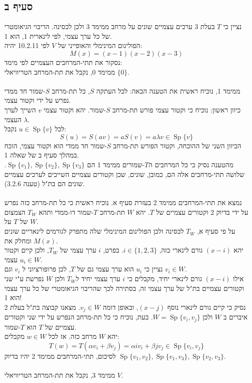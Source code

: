\documentclass{article}
\DeclareMathOperator{\Sp}{Sp}
\begin{document}
\subsection*{סעיף ב}

נציין כי $T$ בעלת 3 ערכים עצמיים שונים על מרחב ממימד 3 ולכן לכסינה. הריבוי הגיאומטרי של כל ערך עצמי, לפי לינארית 1, הוא 1. \\
הפולינום המינימלי והאופייני של $V$ לפי 10.2.11 יהיה:
\[
    M(x)=(x-1)(x-2)(x-3)
\]
נסקור את תתי-המרחבים העצמיים לפי מימד: \\
ממימד 0, נקבל את תת-המרחב הטריוויאלי $\{ 0 \}$. \\\\
ממימד 1, נוכיח ראשית את הטענה הבאה: לכל העתקה $S$, כל תת-מרחב $S$-שמור חד ממדי נפרש על ידי וקטור עצמי. \\
כיוון ראשון: נוכיח כי וקטור עצמי פורש תת-מרחב $S$-שמור. יהא וקטור עצמי $v$ השייך לערך העצמי $\lambda$. \\
לכל $u\in \Sp\{ v \}$ נקבל:
\[
    S(u)=S(av)=aS(v)=a\lambda v\in \Sp\{ v \}
\]
הכיוון השני של ההוכחה, וקטור הפורש תת-מרחב $S$-שמור חד ממדי הוא וקטור עצמי, הוכח במהלך סעיף ב של שאלה 1.\\
מהטענה נסיק כי כל המרחבים ה$T$-שמורים ממימד 1 הם $\Sp\{ v_1 \}, \Sp\{ v_2 \}, \Sp\{ v_3 \}$. שלושה תתי-מרחבים אלה הם, כמובן, שונים, שכן וקטורים עצמיים השייכים לערכים עצמיים שונים הם בת"ל (טענה 3.2.6). \\\\
נמצא את תתי-המרחבים ממימד 2 בעזרת סעיף א. נוכיח ראשית כי כל תת-מרחב כזה נפרש על ידי בדיוק 2 וקטורים עצמיים של $T$. יהא $W$ תת-מרחב $T$-שמור דו-ממדי ותהא $T_W$ הצמצום של $T$ על $W$. \\
על פי סעיף א, $T_W$ לכסינה ולכן הפולינום המינימלי שלה מתפרק לגורמים לינאריים שונים ומחלק את $M(x)$. \\
יהא $(x-i)$ גורם לינארי כזה, $i\in \{ 1,2,3 \}$. בפרט, $i$ ערך עצמי של $T_W$, ולכן קיים וקטור עצמי $u_i\in W$. \\
נציין כי $u_i$ הוא ערך עצמי גם של $T$, לכן פרופורציוני ל $v_i$ וגם $v_i\in W$. \\
אילו $(x-i)$ גורם לינארי יחיד, מקבלים כי $i$ ערך עצמי יחיד ל$T_W$ ולכן $W$ נפרשת ע"י שני וקטורים עצמיים בת"ל של ערך עצמי זה, בסתירה לכך שהריבוי הגיאומטרי של כל ערך עצמי הוא 1! \\
נסיק כי קיים גורם לינארי נוסף $(x-j)$, ובאופן דומה $v_j\in W$. מצאנו קבוצה בת"ל בעלת 2 איברים ב $W$ ולכן $W=\Sp\{ v_i, v_j \}$.
כעת, נוכיח כי כל תת-מרחב הנפרש על ידי שני וקטורים עצמיים של $T$ הוא $T$-שמור. \\
יהא $W$ מרחב כזה. אז לכל $w\in W$ מקבלים:
\[
    T(w)=T(\alpha v_i + \beta v_j)=\alpha i v_i + \beta j v_j \in \Sp\{ v_i, v_j \}
\]
לסיכום, תתי-המרחבים ממימד 2 יהיו בדיוק $\Sp\{ v_1, v_2 \}, \Sp\{ v_1, v_3 \}, \Sp\{ v_2, v_3 \}$.\\\\
ממימד 3, נקבל את תת-המרחב הטריוויאלי $V$.
\end{document}
